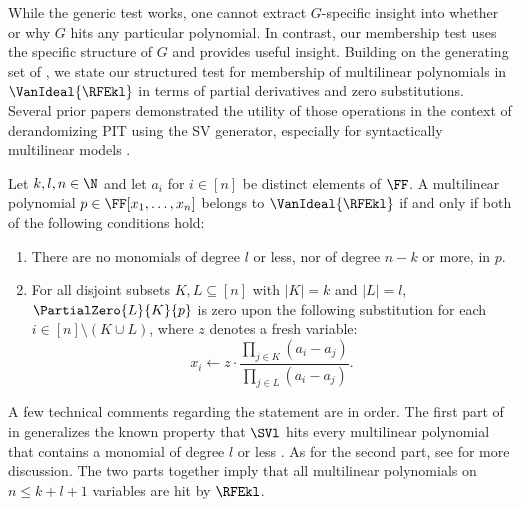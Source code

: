 While the generic test works, one cannot extract $G$-specific insight into whether or why $G$ hits any particular polynomial. In contrast, our membership test uses the specific structure of $G$ and provides useful insight. Building on the generating set of ,
we state our structured test for membership of multilinear polynomials in $\VanIdeal{\RFEkl}$ in terms of partial derivatives and zero substitutions. Several prior papers demonstrated the utility of those operations in the context of derandomizing PIT using the SV generator,
especially for syntactically multilinear models
\cite{ShpilkaVolkovich2008,KMSV2009,AvMV2011}.

\begin{theorem}\label{thm.ideal.membership}
  Let $k, l, n \in \N$ and let $a_i$ for $i \in [n]$ be distinct elements of $\FF$.
  A multilinear polynomial $p \in \FF[x_1,\dots,x_n]$ belongs to
  $\VanIdeal{\RFEkl}$ if and only if both of the following conditions hold:
  \begin{enumerate}
    \item\label{thm.ideal.membership.cond1}
      There are no monomials of degree $l$ or less,
      nor of degree $n-k$ or more, in \(p\).
    \item\label{thm.ideal.membership.cond2}
      For all disjoint subsets $K,L \subseteq [n]$ with $|K|=k$ and $|L|=l$,
      $\PartialZero{L}{K}{p}$ is zero upon the following
      substitution for each \(i\in[n]\setminus (K\cup L)\), where $z$ denotes a fresh variable:
      \begin{equation}\label{eq.thm.ideal.membership.sub}
        x_i \gets z\cdot \frac%
          { \prod_{j \in K} (a_i - a_{j}) }%
          { \prod_{j \in L} (a_i - a_{j}) }.
      \end{equation}
  \end{enumerate}
\end{theorem}

A few technical comments regarding the statement are in order.
The first part of  in
 generalizes the known property that $\SVl$ hits
every multilinear polynomial that contains a monomial of degree $l$ or less
\cite{ShpilkaVolkovich2008}. As for the second part, see  for more discussion.  
The two parts together imply that all multilinear polynomials on $n \le k+l+1$ variables are hit by $\RFEkl$.


